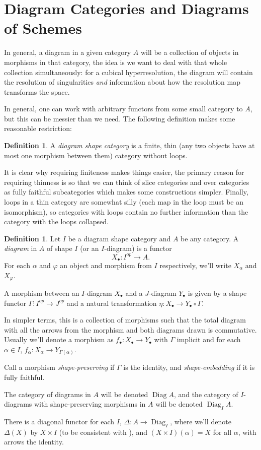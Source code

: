 \documentclass{report}
\theoremstyle{definition}
\newtheorem{definition}[theorem]{Definition}
\DeclareMathOperator{\Diag}{Diag}
\begin{document}
\section{Diagram Categories and Diagrams of Schemes}
In general, a diagram in a given category $A$ will be a collection of objects in morphisms in that category, the idea is we want to deal with that whole collection simultaneously: for a cubical hyperresolution, the diagram will contain the resolution of singularities \textit{and} information about how the resolution map transforms the space.

In general, one can work with arbitrary functors from some small category to $A$, but this can be messier than we need.
The following definition makes some reasonable restriction:
\begin{definition}
	A \textit{diagram shape category} is a finite, thin (any two objects have at most one morphism between them) category without loops.
\end{definition}

It is clear why requiring finiteness makes things easier, the primary reason for requiring thinness is so that we can think of slice categories and over categories as fully faithful subcategories which makes some constructions simpler.
Finally, loops in a thin category are somewhat silly (each map in the loop must be an isomorphism), so categories with loops contain no further information than the category with the loops collapsed.

\begin{definition}
	Let $I$ be a diagram shape category and $A$ be any category.
	A \textit{diagram} in $A$ of shape $I$ (or an $I$-diagram) is a functor
	\[
		X_\bullet : I^{op} \rightarrow A.
	\]
	For each $\alpha$ and $\varphi$ an object and morphism from $I$ respectively, we'll write $X_\alpha$ and $X_\varphi$.
	
	A morphism between an $I$-diagram $X_\bullet$ and a $J$-diagram $Y_\bullet$ is given by a shape functor $\Gamma : I^{op} \rightarrow J^{op}$ and a natural transformation $\eta : X_\bullet \rightarrow Y_\bullet \circ \Gamma$.
	
	In simpler terms, this is a collection of morphisms such that the total diagram with all the arrows from the morphism and both diagrams drawn is commutative.
	Usually we'll denote a morphism as $f_\bullet : X_\bullet \rightarrow Y_\bullet$ with $\Gamma$ implicit and for each $\alpha \in I$, $f_\alpha : X_\alpha \rightarrow Y_{\Gamma(\alpha)}$. 
	
	Call a morphism \textit{shape-preserving} if $\Gamma$ is the identity, and \textit{shape-embedding} if it is fully faithful.
	
	The category of diagrams in $A$ will be denoted $\Diag A$, and the category of $I$-diagrams with shape-preserving morphisms in $A$ will be denoted $\Diag_I A$.
	
	There is a diagonal functor for each $I$, $\Delta : A \rightarrow \Diag_I$, where we'll denote $\Delta(X)$ by $X \times I$ (to be consistent with \cite{Guillen1988}), and $(X \times I)(\alpha) = X$ for all $\alpha$, with arrows the identity.
\end{definition}
\end{document}
